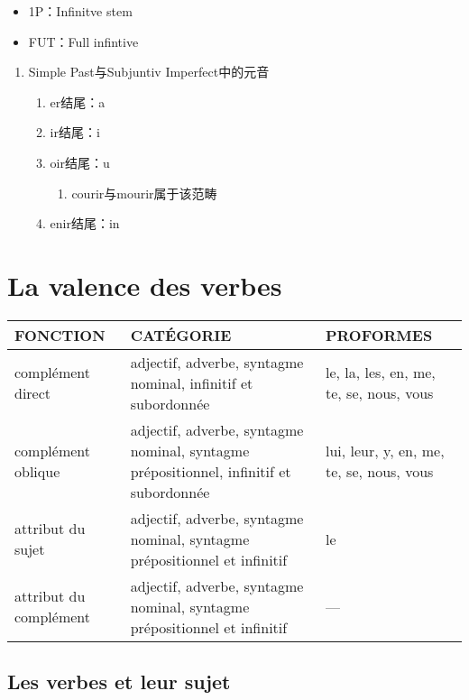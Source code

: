 \documentclass[UTF8]{report}
\begin{document}
\begin{itemize}
    \item 1P：Infinitve stem
    \item FUT：Full infintive
\end{itemize}

\begin{enumerate}
    \item Simple Past与Subjuntiv Imperfect中的元音
    \begin{enumerate}
        \item er结尾：a 
        \item ir结尾：i 
        \item oir结尾：u 
        \begin{enumerate}
            \item courir与mourir属于该范畴
        \end{enumerate}
        \item enir结尾：in
    \end{enumerate}
\end{enumerate}

\section{La valence des verbes}


\begin{table}[H]
    \centering
    \begin{tabular}{>{\RaggedRight}p{3cm} >{\RaggedRight}p{6.5cm} >{\RaggedRight}p{4cm}}
    \toprule
    \textbf{FONCTION} & \textbf{CATÉGORIE} & \textbf{PROFORMES} \\
    \hline
    complément direct & adjectif, adverbe, syntagme nominal, infinitif et subordonnée & le, la, les, en, me, te, se, nous, vous \\
    \hline
    complément oblique & adjectif, adverbe, syntagme nominal, syntagme prépositionnel, infinitif et subordonnée & lui, leur, y, en, me, te, se, nous, vous \\
    \hline
    {attribut du sujet} & adjectif, adverbe, syntagme nominal, syntagme prépositionnel et infinitif & le \\
    \hline
    attribut du complément & adjectif, adverbe, syntagme nominal, syntagme prépositionnel et infinitif & — \\
    \bottomrule
    \end{tabular}
\end{table}

\subsection{Les verbes et leur sujet}
\end{document}
